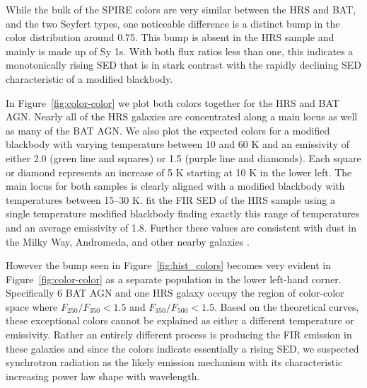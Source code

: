 While the bulk of the SPIRE colors are very similar between the HRS and BAT, and the two Seyfert types, one noticeable difference is a distinct bump in the color distribution around 0.75. This bump is absent in the HRS sample and mainly is made up of Sy 1s. With both flux ratios less than one, this indicates a monotonically rising SED that is in stark contrast with the rapidly declining SED characteristic of a modified blackbody. 

In Figure~\ref{fig:color-color} we plot both colors together for the HRS and BAT AGN. Nearly all of the HRS galaxies are concentrated along a main locus as well as many of the BAT AGN. We also plot the expected colors for a modified blackbody with varying temperature between 10 and 60 K and an emissivity of either 2.0 (green line and squares) or 1.5 (purple line and diamonds). Each square or diamond represents an increase of 5 K starting at 10 K in the lower left. The main locus for both samples is clearly aligned with a modified blackbody with temperatures between 15--30 K. \cite{Cortese:2014qq} fit the FIR SED of the HRS sample using a single temperature modified blackbody finding exactly this range of temperatures and an average emissivity of 1.8. Further these values are consistent with dust in the Milky Way, Andromeda, and other nearby galaxies \citep{Galametz:2012uq, Boselli:2012qv, Smith:2012fj}. 

However the bump seen in Figure~\ref{fig:hist_colors} becomes very evident in Figure~\ref{fig:color-color} as a separate population in the lower left-hand corner. Specifically 6 BAT AGN and one HRS galaxy occupy the region of color-color space where $F_{250}/F_{350} < 1.5$ and $F_{350}/F_{500} < 1.5$. Based on the theoretical curves, these exceptional colors cannot be explained as either a different temperature or emissivity. Rather an entirely different process is producing the FIR emission in these galaxies and since the colors indicate essentially a rising SED, we suspected synchrotron radiation as the likely emission mechanism with its characteristic increasing power law shape with wavelength.
  